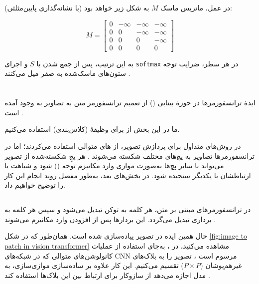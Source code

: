 در عمل، ماتریس ماسک \( M \) به شکل زیر خواهد بود (با نشانه‌گذاری پایین‌مثلثی):


\[
M =
\begin{bmatrix}
	0 & -\infty & -\infty & -\infty \\
	0 & 0 & -\infty & -\infty \\
	0 & 0 & 0 & -\infty \\
	0 & 0 & 0 & 0
\end{bmatrix}
\]

به این ترتیب، پس از جمع شدن با \( S \) و اجرای \texttt{softmax} در هر سطر، ضرایب توجه ستون‌های ماسک‌شده به صفر میل می‌کنند \cite{vaswani2017attention}.

 
\section{}

ایدهٔ ترانسفورمرها در حوزهٔ بینایی () از تعمیم ترانسفورمر متن به تصاویر به وجود آمده است \cite{dosovitskiy2020image}.

ما در این بخش از  برای وظیفهٔ  (کلاس‌بندی) استفاده می‌کنیم.

در روش‌های متداول برای پردازش تصویر، از ‌های متوالی استفاده می‌کردند؛ اما در ترانسفورمرها تصاویر به پچ‌های مختلف شکسته می‌شوند \cite{dosovitskiy2020image}. هر پچِ شکسته‌شده از تصویر می‌تواند با سایر پچ‌ها به‌صورت موازی وارد مکانیزم توجه () شود و شباهت یا ارتباطشان با یکدیگر سنجیده شود. در بخش‌های بعد، به‌طور مفصل روند انجام این کار را توضیح خواهیم داد.


\subsection{}
در ترانسفورمرهای مبتنی بر متن، هر کلمه به توکن تبدیل می‌شود و سپس هر کلمه به برداری تبدیل می‌گردد. این بردارها پس از افزودن  وارد مکانیزم  می‌شوند \cite{vaswani2017attention}. 

حال همین ایده در تصویر پیاده‌سازی شده است. همان‌طور که در شکل \ref{fig:image to patch in vision transformer} مشاهده می‌کنید، در ، به‌جای استفاده از عملیات کانولوشن‌های متوالی که در شبکه‌های CNN مرسوم است \cite{lecun1998gradient,krizhevsky2012imagenet,he2016deep}، تصویر را به بلاک‌های غیرهم‌پوشان (\(P \times P\)) تقسیم می‌کنیم. این کار علاوه بر ساده‌سازی موازی‌سازی، به مدل اجازه می‌دهد از سازوکار  برای ارتباط بین این بلاک‌ها استفاده کند \cite{dosovitskiy2020image}.

